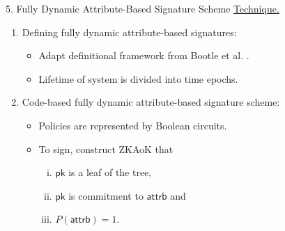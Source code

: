 \begin{frame}{5. Fully Dynamic Attribute-Based Signature Scheme}
	\underline{Technique.}\pause
	\begin{enumerate}
		\item Defining fully dynamic attribute-based signatures:\pause
		\begin{itemize}
			\item Adapt definitional framework from Bootle et al. \cite{BootleCCGG16}.\pause
			\item Lifetime of system is divided into time epochs.\pause
		\end{itemize}
		\item Code-based fully dynamic attribute-based signature scheme:\pause
		\begin{itemize}
			\item Policies are represented by Boolean circuits.\pause
			\item To sign, construct ZKAoK that \pause
			\begin{enumerate}[(i)]
				\item $\textsf{pk}$ is a leaf of the tree,\\ \pause
				\item $\textsf{pk}$ is commitment to $\textsf{attrb}$ and\\ \pause
				\item $P(\textsf{attrb}) = 1$.
			\end{enumerate} 
		\end{itemize}
	\end{enumerate}
\end{frame}